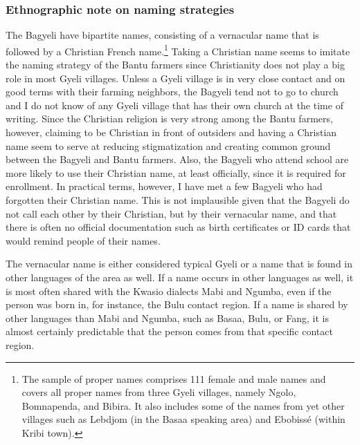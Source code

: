 \newpage

\subsubsection{Ethnographic note on naming strategies}

The Bagyeli have bipartite names, consisting of a vernacular name that is followed by a Christian French name.\footnote{The sample of proper names comprises 111 female and male names and covers all proper names from three Gyeli villages, namely Ngolo, Bomnapenda, and Bibira. It also includes some of the names from yet other villages such as Lebdjom (in the Basaa speaking area) and Ebobissé (within Kribi town).} Taking a Christian name seems to imitate the naming strategy of the Bantu farmers since Christianity does not play a big role in most Gyeli villages. Unless a Gyeli village is in very close contact and on good terms with their farming neighbors, the Bagyeli tend not to go to church and I do not know of any Gyeli village that has their own church at the time of writing. Since the Christian religion is very strong among the Bantu farmers, however, claiming to be Christian in front of outsiders and having a Christian name seem to serve at reducing stigmatization and creating common ground between the Bagyeli and Bantu farmers. Also, the Bagyeli who attend school are more likely to use their Christian name, at least officially, since it is required for enrollment.  In practical terms, however, I have met a few Bagyeli who had forgotten their Christian name. This is not implausible given that the Bagyeli do not call each other by their Christian, but by their vernacular name, and that there is often no official documentation such as birth certificates or ID cards that would remind people of their names. 

The vernacular name is either considered typical Gyeli or a name that is found in other languages of the area as well. If a name occurs in other languages as well, it is most often shared with the Kwasio dialects Mabi and Ngumba, even if the person was born in, for instance, the Bulu contact region. If a name is shared by other languages than Mabi and Ngumba, such as Basaa, Bulu, or Fang, it is almost certainly predictable that the person comes from that specific contact region.

